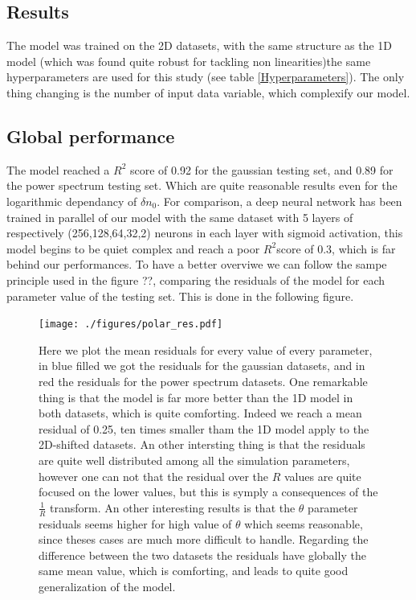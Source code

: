 \documentclass[11pt,a4paper,openany]{report}
\begin{document}
\begin{multicols}{2}
    \section{Results}
    The model was trained on the 2D datasets, with the same structure as the 1D model (which was found quite robust for tackling non linearities)the same hyperparameters are used for this study (see table \ref{Hyperparameters}). The only thing changing is the number of input data variable, which complexify our model.

    \subsection{Global performance}
    The model reached a $R^2$ score of 0.92 for the gaussian testing set, and 0.89 for the power spectrum testing set. Which are quite reasonable results even for the logarithmic dependancy of $\delta n_0$. For comparison, a deep neural network has been trained in parallel of our model with the same dataset with 5 layers of respectively (256,128,64,32,2) neurons in each layer with sigmoid activation, this model begins to be quiet complex and reach a poor $R^2$score of 0.3, which is far behind our performances. To have a better overviwe we can follow the sampe principle used in the figure ??, comparing the residuals of the model for each parameter value of the testing set. This is done in the following figure.
\end{multicols}
\begin{figure}[H]
    \centering
    \texttt{[image: ./figures/polar\_res.pdf]}
    \vspace*{1cm}
    \caption{Here we plot the mean residuals for every value of every parameter, in blue filled we got the residuals for the gaussian datasets, and in red the residuals for the power spectrum datasets. One remarkable thing is that the model is far more better than the 1D model in both datasets, which is quite comforting. Indeed we reach a mean residual of 0.25, ten times smaller tham the 1D model apply to the 2D-shifted datasets. An other intersting thing is that the residuals are quite well distributed among all the simulation parameters, however one can not that the residual over the $R$ values are quite focused on the lower values, but this is symply a consequences of the $\frac{1}{R}$ transform. An other interesting results is that the $\theta$ parameter residuals seems higher for high value of $\theta$ which seems reasonable, since theses cases are much more difficult to handle. Regarding the difference between the two datasets the residuals have globally the same mean value, which is comforting, and leads to quite good generalization of the model.}
\end{figure}
\end{document}
